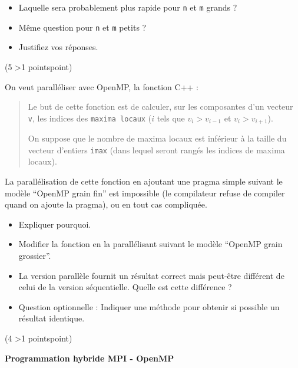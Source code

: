 \documentclass[12pt]{report}
\newcounter{cptPoints}
\newcounter{cptQuestions}
\newcommand\question[2]{\bigskip\par\addtocounter{cptQuestions}{1}\addtocounter{cptPoints}{#2}{\bf Question #1 n\textsuperscript{o} \thecptQuestions} (#2 \ifnum #2>1 points\else point\fi)\par}
\begin{document}
	
	\begin{itemize}
		\item Laquelle sera probablement plus rapide pour {\tt n} et {\tt m} grands ?
		\item M\^eme question pour {\tt n} et {\tt m} petits ?
		\item Justifiez vos réponses.
	\end{itemize}

\vfill\eject
	
	\question{}5
	\medskip
	
	   On veut parall\'eliser avec OpenMP, la fonction C++ :
\begin{center}
	\begin{minipage}{10cm}
	
\end{minipage}
\end{center}
	
	\begin{quotation}\noindent%
		Le but de cette fonction est de calculer, sur les composantes d'un vecteur {\tt v}, les indices des {\tt maxima locaux} ($i$ tels que $v_i > v_{i-1}$ et $v_i > v_{i+1}$).
		
		\noindent%
		On suppose que le nombre de maxima locaux est inf\'erieur \`a la taille du vecteur d'entiers {\tt imax} (dans lequel seront rang\'es les indices de maxima locaux).
	\end{quotation}
	 
 La parall\'elisation de cette fonction en ajoutant une pragma simple suivant le mod\`ele ``OpenMP grain fin'' est impossible (le compilateur refuse de compiler quand on ajoute la pragma), ou en tout cas compliqu\'ee.
 
	 \begin{itemize}
	 	\item Expliquer pourquoi.
	 	\item Modifier la fonction en la parall\'elisant suivant le mod\`ele ``OpenMP grain grossier''.
	 	\item La version parall\`ele fournit un r\'esultat correct mais peut-\^etre diff\'erent de celui de la version s\'equentielle. Quelle est cette diff\'erence ?
	 	\item Question optionnelle : Indiquer une m\'ethode pour obtenir si possible un r\'esultat identique.
	 \end{itemize}
\vfill\eject
	 
\question{}4
         
{\bf Programmation hybride MPI - OpenMP}
\medskip
\end{document}
